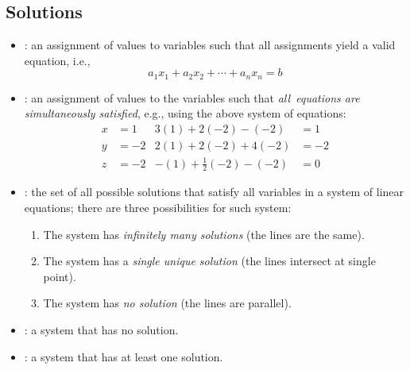 \begin{itemize}
  \subsection{Solutions}\label{Solutions}
  \begin{itemize}
    \item {}: an assignment of values to variables such that all assignments yield a valid equation, i.e.,
    \[%
    a_1x_1+a_2x_2+\cdots+a_n x_n=b
    \]%
    \item {}: an assignment of values to the variables such that \emph{all~equations are simultaneously satisfied}, e.g., using the above system of equations:
    \begin{align*}
      x &= 1  & 3(1) + 2(-2) - (-2) &= 1 \\
      y &= -2 & 2(1) + 2(-2) + 4(-2)&= -2\\
      z &= -2 & -(1) + \tfrac{1}{2}(-2) - (-2) &= 0
    \end{align*}\vspace{-24pt}
    \item {}: the set of all possible solutions that satisfy all variables in a system of linear equations; there are three possibilities for such system: 
      \begin{enumerate}
        \item The system has \emph{infinitely many solutions} (the lines are the same).
        \item The system has a \emph{single unique solution} (the lines intersect at single point).
        \item The system has \emph{no solution} (the lines are parallel).
      \end{enumerate}
    \item {}: a system that has no solution.
    \item {}: a system that has at least one solution.
  \end{itemize}


\end{itemize}
